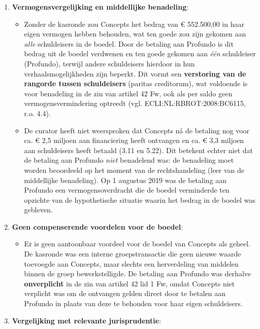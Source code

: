 \documentclass[
  dutch,
  a4paper,
]{article}
\providecommand{\tightlist}{%
  \setlength{\itemsep}{0pt}\setlength{\parskip}{0pt}}
\begin{document}
\begin{enumerate}
\def\labelenumi{\arabic{enumi}.}
\tightlist
\item
  \textbf{Vermogensvergelijking en middellijke benadeling}:

  \begin{itemize}
  \tightlist
  \item
    Zonder de kasronde zou Concepts het bedrag van € 552.500,00 in haar eigen vermogen hebben behouden, wat ten goede zou zijn gekomen aan \emph{alle} schuldeisers in de boedel. Door de betaling aan Profundo is dit bedrag uit de boedel verdwenen en ten goede gekomen aan \emph{één} schuldeiser (Profundo), terwijl andere schuldeisers hierdoor in hun verhaalsmogelijkheden zijn beperkt. Dit vormt een \textbf{verstoring van de rangorde tussen schuldeisers} (paritas creditorum), wat voldoende is voor benadeling in de zin van artikel 42 Fw, ook als per saldo geen vermogensvermindering optreedt (vgl. ECLI:NL:RBROT:2008:BC6115, r.o. 4.4).
  \item
    De curator heeft niet weersproken dat Concepts ná de betaling nog voor ca. € 2,5 miljoen aan financiering heeft ontvangen en ca. € 3,3 miljoen aan schuldeisers heeft betaald (3.11 en 5.22). Dit betekent echter niet dat de betaling aan Profundo \emph{niet} benadelend was: de benadeling moet worden beoordeeld op het moment van de rechtshandeling (leer van de middellijke benadeling). Op 1 augustus 2019 was de betaling aan Profundo een vermogensoverdracht die de boedel verminderde ten opzichte van de hypothetische situatie waarin het bedrag in de boedel was gebleven.
  \end{itemize}
\item
  \textbf{Geen compenserende voordelen voor de boedel}:

  \begin{itemize}
  \tightlist
  \item
    Er is geen aantoonbaar voordeel voor de boedel van Concepts als geheel. De kasronde was een interne groepstransactie die geen nieuwe waarde toevoegde aan Concepts, maar slechts een herverdeling van middelen binnen de groep bewerkstelligde. De betaling aan Profundo was derhalve \textbf{onverplicht} in de zin van artikel 42 lid 1 Fw, omdat Concepts niet verplicht was om de ontvangen gelden direct door te betalen aan Profundo in plaats van deze te behouden voor haar eigen schuldeisers.
  \end{itemize}
\item
  \textbf{Vergelijking met relevante jurisprudentie}:


\end{enumerate}
\end{document}
